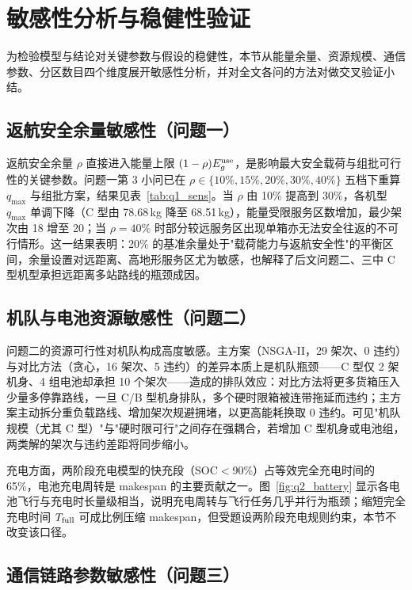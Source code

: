 \section{敏感性分析与稳健性验证}

为检验模型与结论对关键参数与假设的稳健性，本节从能量余量、资源规模、通信参数、分区数目四个维度展开敏感性分析，并对全文各问的方法对做交叉验证小结。

\subsection{返航安全余量敏感性（问题一）}

返航安全余量 $\rho$ 直接进入能量上限 $(1-\rho)E^{\rm use}_g$，是影响最大安全载荷与组批可行性的关键参数。问题一第 3 小问已在 $\rho\in\{10\%,15\%,20\%,30\%,40\%\}$ 五档下重算 $q_{\max}$ 与组批方案，结果见表~\ref{tab:q1_sens}。当 $\rho$ 由 10\% 提高到 30\%，各机型 $q_{\max}$ 单调下降（C 型由 78.68\,kg 降至 68.51\,kg），能量受限服务区数增加，最少架次由 18 增至 20；当 $\rho=40\%$ 时部分较远服务区出现单箱亦无法安全往返的不可行情形。这一结果表明：20\% 的基准余量处于"载荷能力与返航安全性"的平衡区间，余量设置对远距离、高地形服务区尤为敏感，也解释了后文问题二、三中 C 型机型承担远距离多站路线的瓶颈成因。

\subsection{机队与电池资源敏感性（问题二）}

问题二的资源可行性对机队构成高度敏感。主方案（NSGA-II，29 架次、0 违约）与对比方法（贪心，16 架次、5 违约）的差异本质上是机队瓶颈——C 型仅 2 架机身、4 组电池却承担 10 个架次——造成的排队效应：对比方法将更多货箱压入少量多停靠路线，一旦 C/B 型机身排队，多个硬时限箱被连带拖延而违约；主方案主动拆分重负载路线、增加架次规避拥堵，以更高能耗换取 0 违约。可见"机队规模（尤其 C 型）"与"硬时限可行"之间存在强耦合，若增加 C 型机身或电池组，两类解的架次与违约差距将同步缩小。

充电方面，两阶段充电模型的快充段（SOC$<$90\%）占等效完全充电时间的 65\%，电池充电周转是 makespan 的主要贡献之一。图~\ref{fig:q2_battery} 显示各电池飞行与充电时长量级相当，说明充电周转与飞行任务几乎并行为瓶颈；缩短完全充电时间 $T_{\rm full}$ 可成比例压缩 makespan，但受题设两阶段充电规则约束，本节不改变该口径。

\subsection{通信链路参数敏感性（问题三）}

